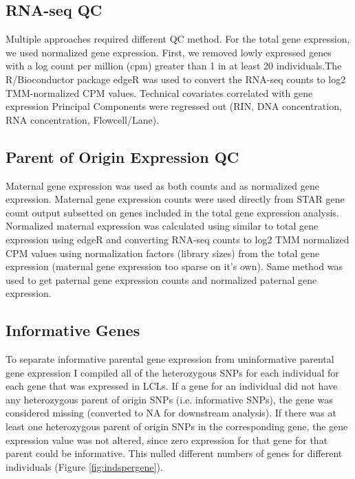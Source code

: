 \subsection{RNA-seq QC}\label{RNA-seq QC}
Multiple approaches required different QC method. For the total gene expression, we used normalized gene expression. First, we removed lowly expressed genes with a log count per million (cpm) greater than 1 in at least 20 individuals.The R/Bioconductor package edgeR was used to convert the RNA-seq counts to log2 TMM-normalized CPM values\cite{Robinson:2010dd,Robinson:2010cw}. Technical covariates correlated with gene expression Principal Components were regressed out (RIN, DNA concentration, RNA concentration, Flowcell/Lane). 

\subsection{Parent of Origin Expression QC}\label{Parent of Origin Expression QC}
Maternal gene expression was used as both counts and as normalized gene expression. Maternal gene expression counts were used directly from STAR gene count output\cite{Dobin:2002by} subsetted on genes included in the total gene expression analysis. 
Normalized maternal expression was calculated using similar to total gene expression using edgeR and converting RNA-seq counts to log2 TMM normalized CPM values using normalization factors (library sizes) from the total gene expression (maternal gene expression too sparse on it's own). 
Same method was used to get paternal gene expression counts and normalized paternal gene expression.

\subsection{Informative Genes}\label{Informative Genes}
To separate informative parental gene expression from uninformative parental gene expression I compiled all of the heterozygous SNPs for each individual for each gene that was expressed in LCLs. If a gene for an individual did not have any heterozygous parent of origin SNPs (i.e. informative SNPs), the gene was considered missing (converted to NA for downstream analysis). If there was at least one heterozygous parent of origin SNPs in the corresponding gene, the gene expression value was not altered, since zero expression for that gene for that parent could be informative. This nulled different numbers of genes for different individuals (Figure \ref{fig:indspergene}).

